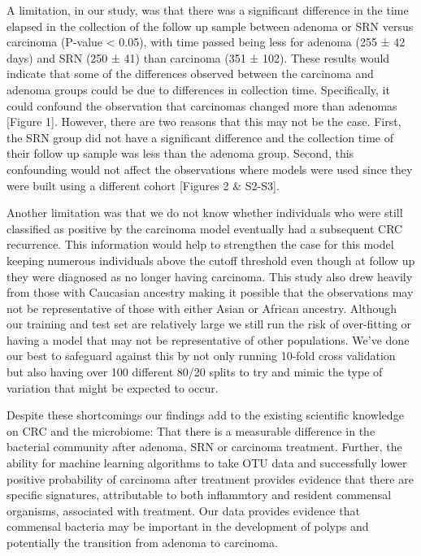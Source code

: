 \documentclass[12pt,]{article}
\begin{document}
A limitation, in our study, was that there was a significant difference
in the time elapsed in the collection of the follow up sample between
adenoma or SRN versus carcinoma (P-value \textless{} 0.05), with time
passed being less for adenoma (255 ± 42 days) and SRN (250 ± 41) than
carcinoma (351 ± 102). These results would indicate that some of the
differences observed between the carcinoma and adenoma groups could be
due to differences in collection time. Specifically, it could confound
the observation that carcinomas changed more than adenomas {[}Figure
1{]}. However, there are two reasons that this may not be the case.
First, the SRN group did not have a significant difference and the
collection time of their follow up sample was less than the adenoma
group. Second, this confounding would not affect the observations where
models were used since they were built using a different cohort
{[}Figures 2 \& S2-S3{]}.

Another limitation was that we do not know whether individuals who were
still classified as positive by the carcinoma model eventually had a
subsequent CRC recurrence. This information would help to strengthen the
case for this model keeping numerous individuals above the cutoff
threshold even though at follow up they were diagnosed as no longer
having carcinoma. This study also drew heavily from those with Caucasian
ancestry making it possible that the observations may not be
representative of those with either Asian or African ancestry. Although
our training and test set are relatively large we still run the risk of
over-fitting or having a model that may not be representative of other
populations. We've done our best to safeguard against this by not only
running 10-fold cross validation but also having over 100 different
80/20 splits to try and mimic the type of variation that might be
expected to occur.

Despite these shortcomings our findings add to the existing scientific
knowledge on CRC and the microbiome: That there is a measurable
difference in the bacterial community after adenoma, SRN or carcinoma
treatment. Further, the ability for machine learning algorithms to take
OTU data and successfully lower positive probability of carcinoma after
treatment provides evidence that there are specific signatures,
attributable to both inflammtory and resident commensal organisms,
associated with treatment. Our data provides evidence that commensal
bacteria may be important in the development of polyps and potentially
the transition from adenoma to carcinoma.
\end{document}
